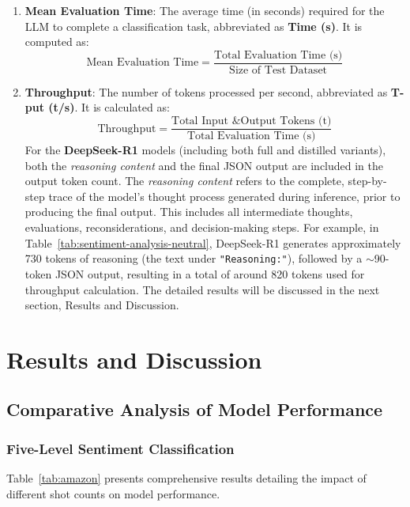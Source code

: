 \documentclass{IEEEcsmag}
\begin{document}
\begin{enumerate}
    \item \textbf{Mean Evaluation Time}: The average time (in seconds) required for the LLM to complete a classification task, abbreviated as \textbf{Time (s)}. It is computed as:
    \[
    \text{Mean Evaluation Time} = \frac{\text{Total Evaluation Time (s)}}{\text{Size of Test Dataset}}
    \]
    
    \item \textbf{Throughput}: The number of tokens processed per second, abbreviated as \textbf{T-put (t/s)}. It is calculated as:
    \[
    \text{Throughput} = \frac{\text{Total Input \& Output Tokens (t)}}{\text{Total Evaluation Time (s)}}
    \]
    For the \textbf{DeepSeek-R1} models (including both full and distilled variants), both the \emph{reasoning content} and the final JSON output are included in the output token count. The \emph{reasoning content} refers to the complete, step-by-step trace of the model's thought process generated during inference, prior to producing the final output. This includes all intermediate thoughts, evaluations, reconsiderations, and decision-making steps. For example, in Table~\ref{tab:sentiment-analysis-neutral}, DeepSeek-R1 generates approximately 730 tokens of reasoning (the text under \texttt{"Reasoning:"}), followed by a \(\sim\)90-token JSON output, resulting in a total of around 820 tokens used for throughput calculation. The detailed results will be discussed in the next section, Results and Discussion.
\end{enumerate}

\vspace{-15pt}
\section{Results and Discussion}

\subsection{Comparative Analysis of Model Performance}

\subsubsection{\textbf{Five-Level Sentiment Classification}} 

Table~\ref{tab:amazon} presents comprehensive results detailing the impact of different shot counts on model performance. 
\end{document}
